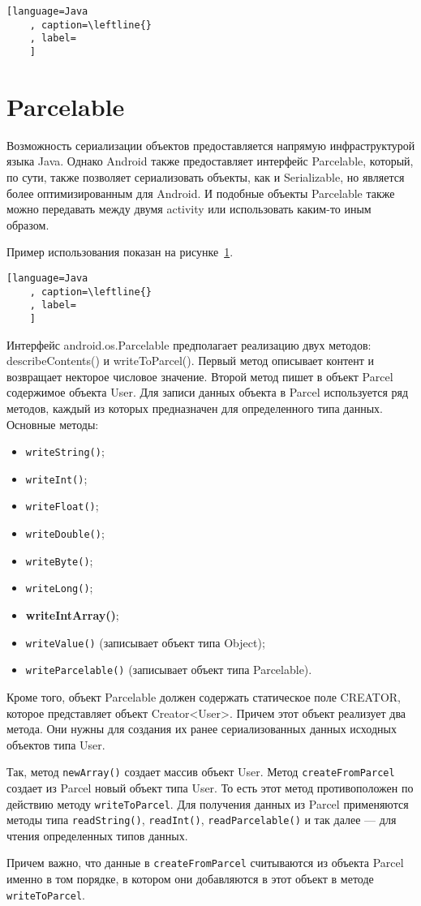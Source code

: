 \begin{lstlisting}[language=Java
	, caption=\leftline{}
	, label=
	]
\end{lstlisting}

\section{Parcelable}
Возможность сериализации объектов предоставляется напрямую
инфраструктурой языка Java. Однако Android также предоставляет
интерфейс Parcelable, который, по сути, также позволяет сериализовать
объекты, как и Serializable, но является более оптимизированным для
Android. И подобные объекты Parcelable также можно передавать между
двумя activity или использовать каким-то иным образом.\par
Пример использования показан на рисунке~\ref{}.

\begin{lstlisting}[language=Java
	, caption=\leftline{}
	, label=
	]
\end{lstlisting}

Интерфейс android.os.Parcelable предполагает реализацию двух методов:
describeContents() и writeToParcel(). Первый метод описывает контент и
возвращает некторое числовое значение. Второй метод пишет в объект Parcel
содержимое объекта User.
Для записи данных объекта в Parcel используется ряд методов, каждый из
которых предназначен для определенного типа данных. Основные методы:
\begin{itemize}
	\item \texttt{writeString()};
	\item \texttt{writeInt()};
	\item \texttt{writeFloat()};
	\item \texttt{writeDouble()};
	\item \texttt{writeByte()};
	\item \texttt{writeLong()};
	\item \textbf{writeIntArray()};
	\item \texttt{writeValue()} (записывает объект типа Object);
	\item \texttt{writeParcelable()} (записывает объект типа Parcelable).
\end{itemize}

Кроме того, объект Parcelable должен содержать статическое поле
CREATOR, которое представляет объект Creator<User>. Причем этот объект
реализует два метода. Они нужны для создания их ранее сериализованных
данных исходных объектов типа User.\par
Так, метод \texttt{newArray()} создает массив объект User.
Метод \texttt{createFromParcel} создает из Parcel новый объект типа User.
То есть этот метод противоположен по действию методу \texttt{writeToParcel}.
Для получения данных из Parcel применяются методы типа \texttt{readString()},
\texttt{readInt()}, \texttt{readParcelable()} и так далее --- для чтения
определенных типов данных.\par
Причем важно, что данные в \texttt{createFromParcel} считываются из объекта
Parcel именно в том порядке, в котором они добавляются в этот объект в методе
\texttt{writeToParcel}.

